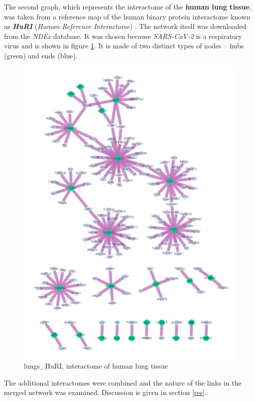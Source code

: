 \documentclass[a4paper]{article}
\begin{document}
The second graph, which represents the interactome of the \textbf{human lung tissue}, was taken from a reference map of the human binary protein interactome known as \textbf{\textit{HuRI}} (\textit{Human Reference Interactome}) \cite{luck}. The network itself was downloaded from the \textit{NDEx}\footnotemark {} database. It was chosen because \textit{SARS-CoV-2} is a respiratory virus and is shown in figure \ref{lungs}. It is made of two distinct types of nodes -- hubs (green) and ends (blue).

\begin{figure}[h!]
  \centering
  \includegraphics[scale=0.65]{pluca_HuRI.png}
  \caption{lungs\_HuRI, interactome of human lung tissue}
  \label{lungs}
\end{figure}

The additional interactomes were combined and the nature of the links in the merged network was examined. Discussion is given in section \ref{res}.
\end{document}
